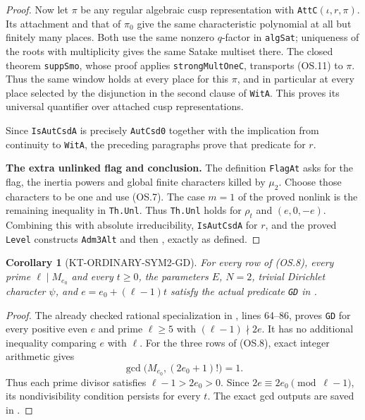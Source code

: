 \documentclass[11pt,a4paper]{article}
\newtheorem{corollary}[theorem]{Corollary}
\theoremstyle{definition}
\renewcommand{\paragraph}[1]{\par\smallskip\noindent\textbf{#1}\quad\ignorespaces}
\begin{document}
\begin{proof}
Now let $\pi$ be any regular algebraic cusp representation
with \texttt{AttC}$(\iota,r,\pi)$. Its attachment and that of
$\pi_0$ give the same characteristic polynomial at all but
finitely many places. Both use the same nonzero $q$-factor
in \texttt{algSat}; uniqueness of the roots with
multiplicity gives the same Satake multiset there.
The closed theorem \texttt{suppSmo}, whose proof applies
\texttt{strongMultOneC}, transports (OS.11) to $\pi$.
Thus the same window holds at every place for this $\pi$,
and in particular at every place selected by the disjunction
in the second clause of \texttt{WitA}. This proves its
universal quantifier over attached cusp representations.

Since \texttt{IsAutCsdA} is precisely \texttt{AutCsd0}
together with the implication from continuity to
\texttt{WitA}, the preceding paragraphs prove that
predicate for $r$.

\paragraph{The extra unlinked flag and conclusion.}
The definition \texttt{FlagAt} asks for the flag, the
inertia powers and global finite characters killed by
$\mu_2$. Choose those characters to be one and use (OS.7).
The case $m=1$ of the proved nonlink is the remaining
inequality in \texttt{Th.Unl}. Thus \texttt{Th.Unl}
holds for $\rho_t$ and $(e,0,-e)$.
Combining this with absolute irreducibility,
\texttt{IsAutCsdA} for $r$, and the proved \texttt{Level}
constructs \texttt{Adm3Alt} and then
, exactly as defined.
\end{proof}

\begin{corollary}[KT-ORDINARY-SYM2-GD]
For every row of (OS.8), every prime $\ell\mid M_{e_0}$
and every $t\geq0$, the parameters $E$, $N=2$, trivial
Dirichlet character $\psi$, and $e=e_0+(\ell-1)t$ satisfy
the actual predicate \texttt{GD} in .
\end{corollary}
\begin{proof}
The already checked rational specialization in
,
lines 64--86, proves \texttt{GD} for every positive even
$e$ and prime $\ell\geq5$ with $(\ell-1)\nmid2e$.
It has no additional inequality comparing $e$ with $\ell$.
For the three rows of (OS.8), exact integer arithmetic gives
\[
                   \gcd\bigl(M_{e_0},(2e_0+1)!\bigr)=1.
\]
Thus each prime divisor satisfies $\ell-1>2e_0>0$.
Since $2e\equiv2e_0\pmod{\ell-1}$, its nondivisibility
condition persists for every $t$. The exact gcd outputs
are saved in .
\end{proof}
\end{document}
